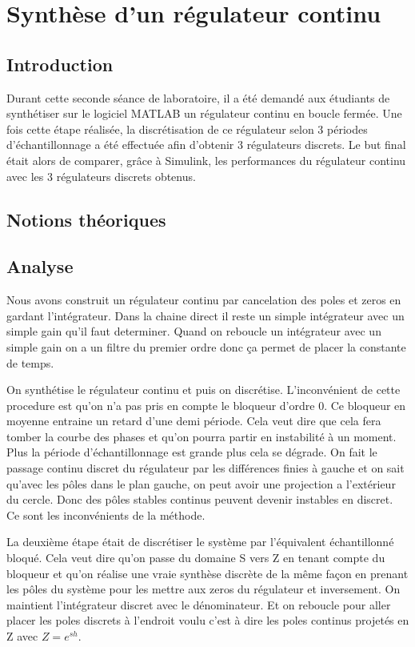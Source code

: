 \chapter{Synthèse d'un régulateur continu}

\section{Introduction}
Durant cette seconde séance de laboratoire, il a été demandé aux étudiants de synthétiser sur le logiciel MATLAB un régulateur continu en boucle fermée.
Une fois cette étape réalisée, la discrétisation de ce régulateur selon 3 périodes d'échantillonnage a été effectuée afin d'obtenir 3 régulateurs discrets.
Le but final était alors de comparer, grâce à Simulink, les performances du régulateur continu avec les 3 régulateurs discrets obtenus. 

\section{Notions théoriques}


\section{Analyse}
Nous avons construit un régulateur continu par cancelation des poles et zeros en gardant l'intégrateur.
Dans la chaine direct il reste un simple intégrateur avec un simple gain qu'il faut determiner.
Quand on reboucle un intégrateur avec un simple gain on a un filtre du premier ordre donc ça permet de placer la constante de temps.

On synthétise le régulateur continu et puis on discrétise.
L'inconvénient de cette procedure est qu'on n'a pas pris en compte le bloqueur d'ordre 0.
Ce bloqueur en moyenne entraine un retard d'une demi période.
Cela veut dire que cela fera tomber la courbe des phases et qu'on pourra partir en instabilité à un moment.
Plus la période d'échantillonnage est grande plus cela se dégrade.
On fait le passage continu discret du régulateur par les différences finies à gauche et on sait qu'avec les pôles dans le plan gauche, on peut avoir une projection a l'extérieur du cercle.
Donc des pôles stables continus peuvent devenir instables en discret. Ce sont les inconvénients de la méthode.

La deuxième étape était de discrétiser le système par l'équivalent échantillonné bloqué.
Cela veut dire qu'on passe du domaine S vers Z en tenant compte du bloqueur et qu'on réalise une vraie synthèse discrète de la même façon en prenant les pôles du système pour les mettre aux zeros du régulateur et inversement.
On maintient l'intégrateur discret avec le dénominateur. 
Et on reboucle pour aller placer les poles discrets à l'endroit voulu c'est à dire les poles continus projetés en Z avec $Z=e^{sh}$.


